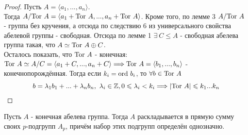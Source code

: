 \begin{proof}
    Пусть $A = \langle a_1,...,a_n \rangle$. \\
    Тогда $A/\textup{Tor } A = \langle a_1 + \textup{Tor } A,...,a_n + \textup{Tor } A\rangle$. Кроме того, по лемме 3 $A/\textup{Tor } A$ - группа без кручения, а отсюда по следствию 6 из универсального свойства абелевой группы - свободная. Отсюда по лемме 1 $\exists \ C \leq A$ - свободная абелева группа такая, что $A \simeq \textup{Tor } A \oplus C$.\\
    Осталось показать, что $\textup{Tor } A$ - конечная:
    $\textup{Tor } A \simeq A/C = \langle a_1 + C,...,a_n + C \rangle \Longrightarrow \textup{Tor } A = \langle b_1,...,b_n \rangle$ - конечнопорождённая.
    Тогда если $k_i = \textup{ord } b_i$, то $\forall b \in \textup{Tor } A$
    \[b = \lambda_1b_1 + ... + \lambda_nb_n, \ \lambda_i \in \Z, 0 \leqslant \lambda_i < k_i \Longrightarrow |\textup{Tor } A| \leqslant k_1...k_n \]
\end{proof}
\begin{lemmanum}
    Пусть $A$ - конечная абелева группа. Тогда $A$ раскладывается в прямую сумму своих $p$-подгрупп $A_p$, причём набор этих подгрупп определён однозначно.
\end{lemmanum}
